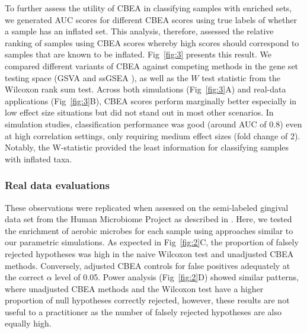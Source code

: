 \documentclass[10pt,letterpaper]{article}
\begin{document}
To further assess the utility of CBEA in classifying samples with enriched sets, we generated AUC scores for different CBEA scores using true labels of whether a sample has an inflated set. This analysis, therefore, assessed the relative ranking of samples using CBEA scores whereby high scores should correspond to samples that are known to be inflated. Fig~\ref{fig:3} presents this result. We compared different variants of CBEA against competing methods in the gene set testing space (GSVA \cite{hanzelmann2013} and ssGSEA \cite{barbie2009}), as well as the $W$ test statistic from the Wilcoxon rank sum test. Across both simulations (Fig~\ref{fig:3}A) and real-data applications (Fig~\ref{fig:3}B), CBEA scores perform marginally better especially in low effect size situations but did not stand out in most other scenarios. In simulation studies, classification performance was good (around AUC of 0.8) even at high correlation settings, only requiring medium effect sizes (fold change of 2). Notably, the W-statistic provided the least information for classifying samples with inflated taxa.

\subsubsection*{Real data evaluations}  
These observations were replicated when assessed on the semi-labeled gingival data set from the Human Microbiome Project as described in . Here, we tested the enrichment of aerobic microbes for each sample using approaches similar to our parametric simulations. As expected in Fig~\ref{fig:2}C, the proportion of falsely rejected hypotheses was high in the naive Wilcoxon test and unadjusted CBEA methods. Conversely, adjusted CBEA controls for false positives adequately at the correct $\alpha$ level of 0.05. Power analysis (Fig~\ref{fig:2}D) showed similar patterns, where unadjusted CBEA methods and the Wilcoxon test have a higher proportion of null hypotheses correctly rejected, however, these results are not useful to a practitioner as the number of falsely rejected hypotheses are also equally high.  
\end{document}
